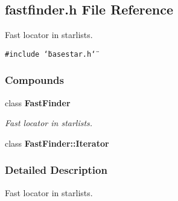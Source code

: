 \subsection{fastfinder.h File Reference}
\label{fastfinder_h}
Fast locator in starlists. 


{\tt \#include \char`\"{}basestar.h\char`\"{}}\par
\subsubsection*{Compounds}
\begin{CompactItemize}
\item 
class {\bf Fast\-Finder}
\begin{CompactList}\small\item\em Fast locator in starlists.\item\end{CompactList}\item 
class {\bf Fast\-Finder::Iterator}
\end{CompactItemize}


\subsubsection{Detailed Description}
Fast locator in starlists.



